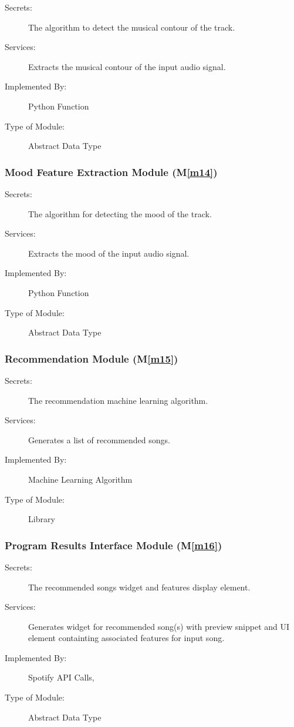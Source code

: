 \documentclass[12pt, titlepage]{article}
\newcommand{\mref}[1]{M\ref{#1}}
\begin{document}
\begin{description}
\item[Secrets:] The algorithm to detect the musical contour of the track. 
\item[Services:] Extracts the musical contour of the input audio signal.  
\item[Implemented By:] Python Function
\item[Type of Module:] Abstract Data Type
\end{description}

\subsubsection{Mood Feature Extraction Module (\mref{m14})}

\begin{description}
\item[Secrets:] The algorithm for detecting the mood of the track. 
\item[Services:] Extracts the mood of the input audio signal. 
\item[Implemented By:] Python Function
\item[Type of Module:] Abstract Data Type
\end{description}

\subsubsection{Recommendation Module (\mref{m15})}

\begin{description}
\item[Secrets:] The recommendation machine learning algorithm. 
\item[Services:] Generates a list of recommended songs. 
\item[Implemented By:] Machine Learning Algorithm
\item[Type of Module:] Library
\end{description}

\subsubsection{Program Results Interface Module (\mref{m16})}

\begin{description}
\item[Secrets:] The recommended songs widget and features display element. 
\item[Services:] Generates widget for recommended song(s) with preview snippet and UI element containting associated features for input song. 
\item[Implemented By:] Spotify API Calls, 
\item[Type of Module:] Abstract Data Type
\end{description}
\end{document}
